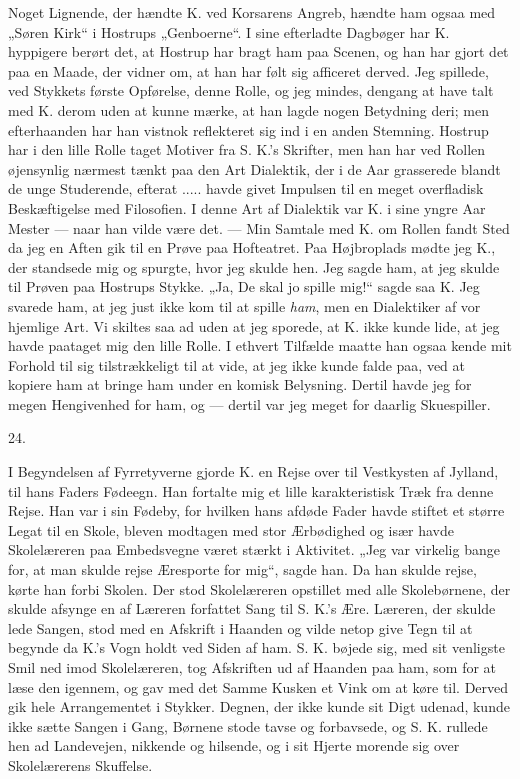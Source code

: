 \documentclass[12pt,a4paper,openany]{book}
\newcommand{\secnum}[1]{\par\begin{center}#1\end{center}\par\nobreak}
\newcommand{\opage}[1]{\marginnote{\footnotesize\textit{[#1]}}}
\begin{document}
Noget Lignende, der hændte K. ved Korsarens Angreb, hændte ham
ogsaa med „Søren Kirk“ i Hostrups „Genboerne“. I sine efterladte
Dagbøger har K. hyppigere berørt det, at Hostrup har bragt ham paa
Scenen, og han har gjort det paa en Maade, der vidner om, at han
har følt sig afficeret derved. Jeg spillede, ved Stykkets første
Opførelse, denne Rolle, og jeg mindes, dengang at have talt med
K. derom uden at kunne mærke, at han lagde nogen Betydning deri;
men efterhaanden har han vistnok reflekteret sig ind i en anden
Stemning. Hostrup har i den lille Rolle taget Motiver fra S. K.’s
Skrifter, men han har ved Rollen øjensynlig nærmest tænkt paa den
Art Dialektik, der i de Aar grasserede blandt de unge Studerende,
efterat ..... havde givet Impulsen til en meget overfladisk
Beskæftigelse med Filosofien. I denne Art af Dialektik var K. i
sine yngre Aar Mester --- naar han vilde være det. --- Min Samtale
\opage{354}med K. om Rollen fandt Sted da jeg en Aften gik til en
Prøve paa Hofteatret. Paa Højbroplads mødte jeg K., der standsede
mig og spurgte, hvor jeg skulde hen. Jeg sagde ham, at jeg skulde
til Prøven paa Hostrups Stykke. „Ja, De skal jo spille mig!“
sagde saa K. Jeg svarede ham, at jeg just ikke kom til at spille
\emph{ham}, men en Dialektiker af vor hjemlige Art. Vi skiltes saa
ad uden at jeg sporede, at K. ikke kunde lide, at jeg havde
paataget mig den lille Rolle. I ethvert Tilfælde maatte han ogsaa
kende mit Forhold til sig tilstrækkeligt til at vide, at jeg ikke
kunde falde paa, ved at kopiere ham at bringe ham under en komisk
Belysning. Dertil havde jeg for megen Hengivenhed for ham, og ---
dertil var jeg meget for daarlig Skuespiller.

\secnum{24.}

I Begyndelsen af Fyrretyverne gjorde K. en Rejse over til
Vestkysten af Jylland, til hans Faders Fødeegn. Han fortalte mig
et lille karakteristisk Træk fra denne Rejse. Han var i sin
Fødeby, for hvilken hans afdøde Fader havde stiftet et større
Legat til en Skole, bleven modtagen med stor Ærbødighed og især
havde Skolelæreren paa Embedsvegne været stærkt i Aktivitet. „Jeg
var virkelig bange for, at man skulde rejse Æresporte for mig“,
sagde han. Da han skulde rejse, kørte han forbi Skolen. Der stod
Skolelæreren opstillet med alle Skolebørnene, der skulde afsynge
en af Læreren forfattet Sang til S. K.’s Ære. Læreren, der skulde
lede Sangen, stod med en Afskrift i Haanden og vilde netop give
Tegn til at begynde da K.’s Vogn holdt ved Siden af ham. S. K.
bøjede sig, med sit venligste Smil ned imod Skolelæreren, tog
Afskriften ud af Haanden paa ham, som for at læse den igennem, og
gav med det Samme Kusken et Vink om at køre til. Derved gik hele
Arrangementet i Stykker. Degnen, der ikke kunde sit Digt udenad,
kunde ikke sætte Sangen i Gang, Børnene stode tavse
\opage{355}og forbavsede, og S. K. rullede hen ad Landevejen,
nikkende og hilsende, og i sit Hjerte morende sig over
Skolelærerens Skuffelse.
\end{document}
